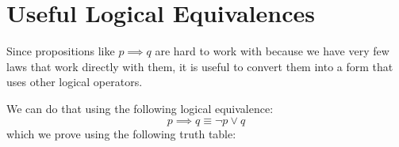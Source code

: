 \section{Useful Logical Equivalences}

Since propositions like $p \implies q$ are hard to work with because we have very few
laws that work directly with them, it is useful to convert them into a form that uses
other logical operators.

We can do that using the following logical equivalence:
\begin{equation}
  p \implies q \equiv \neg p \lor q
\end{equation}
which we prove using the following truth table:
\begin{table}[H]
  \centering
  \caption{A proof of \(p \implies q \equiv \neg p \lor q\).}
\end{table}
